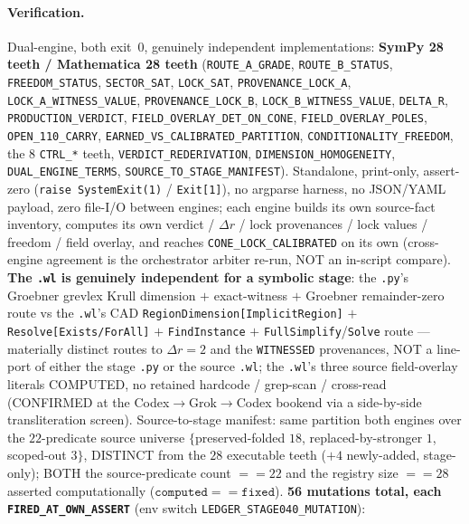 \paragraph{Verification.}
Dual-engine, both exit~0, genuinely independent implementations:
\textbf{SymPy 28 teeth / Mathematica 28 teeth}
(\texttt{ROUTE\_A\_GRADE}, \texttt{ROUTE\_B\_STATUS}, \texttt{FREEDOM\_STATUS},
\texttt{SECTOR\_SAT}, \texttt{LOCK\_SAT}, \texttt{PROVENANCE\_LOCK\_A},
\texttt{LOCK\_A\_WITNESS\_VALUE}, \texttt{PROVENANCE\_LOCK\_B},
\texttt{LOCK\_B\_WITNESS\_VALUE}, \texttt{DELTA\_R}, \texttt{PRODUCTION\_VERDICT},
\texttt{FIELD\_OVERLAY\_DET\_ON\_CONE}, \texttt{FIELD\_OVERLAY\_POLES},
\texttt{OPEN\_110\_CARRY}, \texttt{EARNED\_VS\_CALIBRATED\_PARTITION},
\texttt{CONDITIONALITY\_FREEDOM}, the 8 \texttt{CTRL\_*} teeth,
\texttt{VERDICT\_REDERIVATION}, \texttt{DIMENSION\_HOMOGENEITY},
\texttt{DUAL\_ENGINE\_TERMS}, \texttt{SOURCE\_TO\_STAGE\_MANIFEST}). Standalone,
print-only, assert-zero (\texttt{raise SystemExit(1)} / \texttt{Exit[1]}), no
argparse harness, no JSON/YAML payload, zero file-I/O between engines; each engine
builds its own source-fact inventory, computes its own verdict / \(\Delta r\) /
lock provenances / lock values / freedom / field overlay, and reaches
\texttt{CONE\_LOCK\_CALIBRATED} on its own (cross-engine agreement is the
orchestrator arbiter re-run, NOT an in-script compare). \textbf{The \texttt{.wl} is
genuinely independent for a symbolic stage}: the \texttt{.py}'s Groebner grevlex
Krull dimension \(+\) exact-witness \(+\) Groebner remainder-zero route vs the
\texttt{.wl}'s CAD \texttt{RegionDimension[ImplicitRegion]} \(+\)
\texttt{Resolve[Exists/ForAll]} \(+\) \texttt{FindInstance} \(+\)
\texttt{FullSimplify}/\texttt{Solve} route --- materially distinct routes to
\(\Delta r{=}2\) and the \texttt{WITNESSED} provenances, NOT a line-port of either
the stage \texttt{.py} or the source \texttt{.wl}; the \texttt{.wl}'s three source
field-overlay literals COMPUTED, no retained hardcode / grep-scan / cross-read
(CONFIRMED at the Codex\(\to\)Grok\(\to\)Codex bookend via a side-by-side
transliteration screen). Source-to-stage manifest: same partition both engines over
the \(22\)-predicate source universe \(\{\)preserved-folded \(18\),
replaced-by-stronger \(1\), scoped-out \(3\)\(\}\), DISTINCT from the \(28\)
executable teeth (\(+4\) newly-added, stage-only); BOTH the source-predicate count
\(==22\) and the registry size \(==28\) asserted computationally
(\(\texttt{computed}==\texttt{fixed}\)). \textbf{56 mutations total, each
\texttt{FIRED\_AT\_OWN\_ASSERT}} (env switch \texttt{LEDGER\_STAGE040\_MUTATION}):

